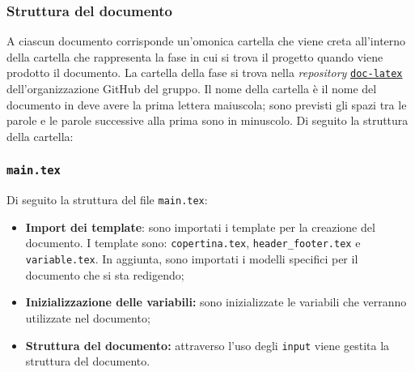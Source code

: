 \subsubsection{Struttura del documento}

A ciascun documento corrisponde un'omonica cartella che viene creta all'interno
della cartella che rappresenta la fase in cui si trova il progetto quando viene
prodotto il documento. La cartella della fase si trova nella \textit{repository}
\href{https://github.com/Project-SWEnergy/doc-latex}{\texttt{doc-latex}}
dell'organizzazione GitHub del gruppo.
Il nome della cartella è il nome del documento in deve avere la prima lettera
maiuscola; sono previsti gli spazi tra le parole e le parole successive alla
prima sono in minuscolo. Di seguito la struttura della cartella:

\vspace{0.5cm}


\subsubsection{\texttt{main.tex}}
Di seguito la struttura del file \texttt{main.tex}:
\begin{itemize}
	\item \textbf{Import dei template}: sono importati i template per la
	      creazione del documento. I template sono: \texttt{copertina.tex},
	      \texttt{header\_footer.tex} e \texttt{variable.tex}. In aggiunta, sono
	      importati i modelli specifici per il documento che si sta redigendo;

	\item \textbf{Inizializzazione delle variabili:} sono inizializzate le
	      variabili che verranno utilizzate nel documento;

	\item \textbf{Struttura del documento:} attraverso l'uso degli
	      \texttt{input} viene gestita la struttura del documento.
\end{itemize}

